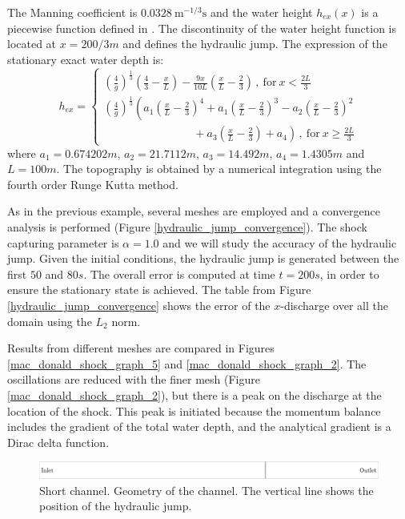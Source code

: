 \documentclass[a4paper,12pt]{elsarticle}
\begin{document}
The Manning coefficient is $0.0328\ \text{m}^{-1/3}\text{s}$ and the water height $h_{ex}(x)$ is a piecewise function defined in \cite{delestre2013}. The discontinuity of the water height function is located at $x=200/3m$ and defines the hydraulic jump. The expression of the stationary exact water depth is:
\begin{equation} \label{jump_height_definition}
    h_{ex} = \begin{cases}
        \left(\frac{4}{g}\right)^\frac{1}{3} \left(\frac{4}{3} - \frac{x}{L}\right) - \frac{9x}{10L}
            \left(\frac{x}{L} - \frac{2}{3}\right) \, ,\ \text{for} \ x < \frac{2L}{3}\\
        \left(\frac{4}{g}\right)^\frac{1}{3} \left(
              a_1 \left(\frac{x}{L} - \frac{2}{3}\right)^4
            + a_1 \left(\frac{x}{L} - \frac{2}{3}\right)^3
            - a_2 \left(\frac{x}{L} - \frac{2}{3}\right)^2 \right. \\ \left. \qquad\qquad\qquad\qquad
            + a_3 \left(\frac{x}{L} - \frac{2}{3}\right)
            + a_4
        \right) \, ,\ \text{for} \ x \geq \frac{2L}{3}
    \end{cases}
\end{equation}
where $a_1=0.674202m$, $a_2=21.7112m$, $a_3=14.492m$, $a_4=1.4305m$ and $L=100m$. The topography is obtained by a numerical integration using the fourth order Runge Kutta method.

As in the previous example, several meshes are employed and a convergence analysis is performed (Figure \ref{hydraulic_jump_convergence}). The shock capturing parameter is $\alpha=1.0$ and we will study the accuracy of the hydraulic jump. 
Given the initial conditions, the hydraulic jump is generated between the first $50$ and $80s$. The overall error is computed at time $t=200s$, in order to ensure the stationary state is achieved.
The table from Figure \ref{hydraulic_jump_convergence} shows the error of the $x$-discharge over all the domain using the $L_2$ norm.

Results from different meshes are compared in Figures \ref{mac_donald_shock_graph_5} and \ref{mac_donald_shock_graph_2}. The oscillations are reduced with the finer mesh (Figure \ref{mac_donald_shock_graph_2}), but there is a peak on the discharge at the location of the shock. This peak is initiated because the momentum balance includes the gradient of the total water depth, and the analytical gradient is a Dirac delta function.

\begin{figure}
    \includegraphics[width=\textwidth]{img/jump/sketch.pdf}
    \caption{Short channel. Geometry of the channel. The vertical line shows the position of the hydraulic jump.}
    \label{chanel_geometry}
\end{figure}
\end{document}
